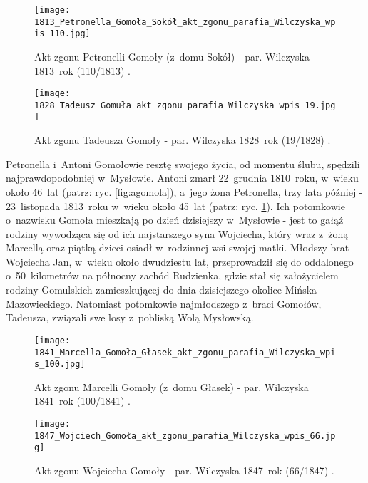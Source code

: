 \begin{figure}[!ht]
    \vspace*{0.5cm}
    \centering \texttt{[image: 
        1813\_Petronella\_Gomoła\_Sokół\_akt\_zgonu\_parafia\_Wilczyska\_wpis\_110.jpg]}
    \captionsetup{format=hang}
    \caption{Akt zgonu Petronelli Gomoły (z~domu Sokół) - par. Wilczyska 
    1813~rok (110/1813) \cite{par_wilczyska1}.}
    \label{fig:pgomola_1813}
\end{figure}

\begin{figure}[!ht]
    \vspace*{0.5cm}
    \centering \texttt{[image: 
        1828\_Tadeusz\_Gomuła\_akt\_zgonu\_parafia\_Wilczyska\_wpis\_19.jpg]}   
    \captionsetup{format=hang}
    \caption{Akt zgonu Tadeusza Gomoły - par. Wilczyska 1828~rok (19/1828) 
    \cite{par_wilczyska1}.}
    \label{fig:tgomola_1828}
\end{figure}

Petronella i~Antoni Gomołowie resztę swojego życia, od momentu ślubu, 
spędzili najprawdopodobniej w~Mysłowie. Antoni zmarł 22~grudnia 1810~roku, 
w~wieku około 46~lat (patrz: ryc. \ref{fig:agomola}), a~jego żona Petronella, 
trzy lata później - 23~listopada 1813~roku w~wieku około 45~lat  (patrz: ryc. 
\ref{fig:pgomola_1813}). Ich potomkowie o~nazwisku Gomoła mieszkają po dzień 
dzisiejszy w~Mysłowie - jest to gałąź rodziny wywodząca się od ich 
najstarszego syna Wojciecha, który wraz z~żoną Marcellą oraz piątką dzieci 
osiadł w~rodzinnej wsi swojej matki. Młodszy brat Wojciecha Jan, w~wieku 
około dwudziestu lat, przeprowadził się do oddalonego o~50~kilometrów na 
północny zachód Rudzienka, gdzie stał się założycielem rodziny Gomulskich 
zamieszkującej do dnia dzisiejszego okolice Mińska Mazowieckiego. Natomiast 
potomkowie najmłodszego z~braci Gomołów, Tadeusza, związali swe losy 
z~pobliską Wolą Mysłowską.

\begin{figure}[!ht]
    \vspace*{0.5cm}
    \centering \texttt{[image: 
        1841\_Marcella\_Gomoła\_Głasek\_akt\_zgonu\_parafia\_Wilczyska\_wpis\_100.jpg]}  
    \captionsetup{format=hang}
    \caption{Akt zgonu Marcelli Gomoły (z~domu Głasek) - par. Wilczyska 
    1841~rok (100/1841) \cite{par_wilczyska1}.}
    \label{fig:mgomola_1841}
\end{figure}

\begin{figure}[!ht]
    \vspace*{0.5cm}
    \centering \texttt{[image: 
        1847\_Wojciech\_Gomoła\_akt\_zgonu\_parafia\_Wilczyska\_wpis\_66.jpg]}    
    \captionsetup{format=hang}
    \caption{Akt zgonu Wojciecha Gomoły - par. Wilczyska 1847~rok (66/1847) 
    \cite{par_wilczyska1}.}
    \label{fig:wgomola_1847}
\end{figure}


